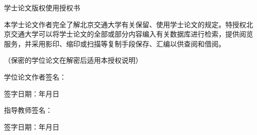\cleardoublepage{}

\thispagestyle{fancynofoot}
\vspace*{-0.53cm}
\begin{center}
{\heiti 学士论文版权使用授权书\bigskip}
\end{center}

本学士论文作者完全了解北京交通大学有关保留、使用学士论文的规定。特授权北京交通大学可以将学士论文的全部或部分内容编入有关数据库进行检索，提供阅览服务，并采用影印、缩印或扫描等复制手段保存、汇编以供查阅和借阅。\\
\vspace{-0.4cm}
\begin{center}
（保密的学位论文在解密后适用本授权说明）
\end{center}
\vspace{3cm}

\begin{minipage}[t]{0.5\textwidth}
学位论文作者签名：\vspace{4ex}

签字日期：\hspace{2em}年\hspace{2em}月\hspace{2em}日
\end{minipage} 
\hfill
\begin{minipage}[t]{0.5\textwidth}
指导教师签名：\vspace{4ex}

签字日期：\hspace{2em}年\hspace{2em}月\hspace{2em}日
\end{minipage} 	
\newpage
